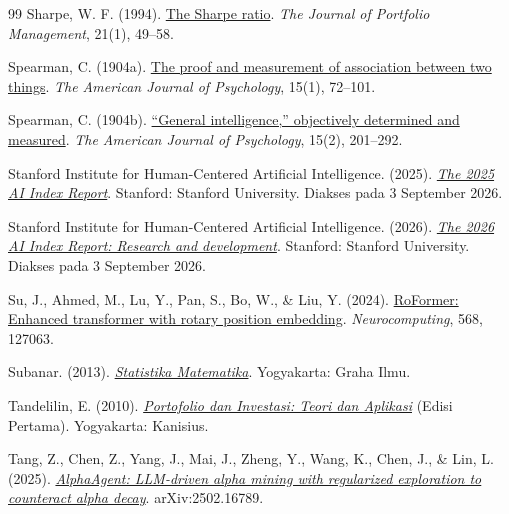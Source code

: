 \begin{thebibliography}{99}
Sharpe, W. F. (1994).
\href{https://doi.org/10.3905/jpm.1994.409501}{The Sharpe ratio}.
\emph{The Journal of Portfolio Management}, 21(1), 49--58.

Spearman, C. (1904a).
\href{https://doi.org/10.2307/1412159}{The proof and measurement of
association between two things}. \emph{The American Journal of Psychology},
15(1), 72--101.

Spearman, C. (1904b).
\href{https://doi.org/10.2307/1412107}{``General intelligence,'' objectively
determined and measured}. \emph{The American Journal of Psychology}, 15(2),
201--292.

Stanford Institute for Human-Centered Artificial Intelligence. (2025).
\href{https://hai.stanford.edu/ai-index/2025-ai-index-report}{\emph{The 2025 AI
Index Report}}. Stanford: Stanford University. Diakses pada 3 September 2026.

Stanford Institute for Human-Centered Artificial Intelligence. (2026).
\href{https://hai.stanford.edu/ai-index/2026-ai-index-report/research-and-development}{\emph{The
2026 AI Index Report: Research and development}}. Stanford: Stanford University.
Diakses pada 3 September 2026.

Su, J., Ahmed, M., Lu, Y., Pan, S., Bo, W., \& Liu, Y. (2024).
\href{https://arxiv.org/abs/2104.09864}{RoFormer: Enhanced transformer with
rotary position embedding}. \emph{Neurocomputing}, 568, 127063.

Subanar. (2013).
\href{https://opac.perpusnas.go.id/DetailOpac.aspx?id=901323}{\emph{Statistika
Matematika}}. Yogyakarta: Graha Ilmu.

Tandelilin, E. (2010).
\href{https://openlibrary.telkomuniversity.ac.id/pustaka/155750/portofolio-dan-investasi-teori-dan-aplikasi.html}{\emph{Portofolio
dan Investasi: Teori dan Aplikasi}} (Edisi Pertama). Yogyakarta: Kanisius.

Tang, Z., Chen, Z., Yang, J., Mai, J., Zheng, Y., Wang, K., Chen, J., \& Lin, L.
(2025).
\href{https://arxiv.org/abs/2502.16789}{\emph{AlphaAgent: LLM-driven alpha
mining with regularized exploration to counteract alpha decay}}.
arXiv:2502.16789.


\end{thebibliography}
